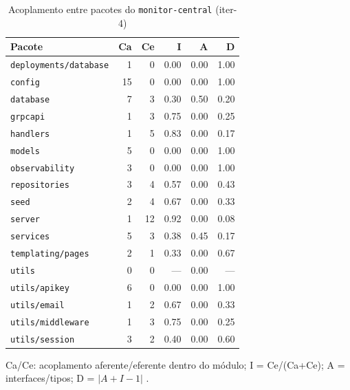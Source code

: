\begin{table}[htbp]
  \centering\small
  \caption{Acoplamento entre pacotes do \texttt{monitor-central} (iter-4)}
  \label{tab:iter-4-acoplamento-central}
  \begin{tabular}{lrrrrr}
    \toprule
    Pacote & Ca & Ce & I & A & D \\
    \midrule
    \texttt{deployments/database} & 1 & 0 & 0.00 & 0.00 & 1.00 \\
    \texttt{config} & 15 & 0 & 0.00 & 0.00 & 1.00 \\
    \texttt{database} & 7 & 3 & 0.30 & 0.50 & 0.20 \\
    \texttt{grpcapi} & 1 & 3 & 0.75 & 0.00 & 0.25 \\
    \texttt{handlers} & 1 & 5 & 0.83 & 0.00 & 0.17 \\
    \texttt{models} & 5 & 0 & 0.00 & 0.00 & 1.00 \\
    \texttt{observability} & 3 & 0 & 0.00 & 0.00 & 1.00 \\
    \texttt{repositories} & 3 & 4 & 0.57 & 0.00 & 0.43 \\
    \texttt{seed} & 2 & 4 & 0.67 & 0.00 & 0.33 \\
    \texttt{server} & 1 & 12 & 0.92 & 0.00 & 0.08 \\
    \texttt{services} & 5 & 3 & 0.38 & 0.45 & 0.17 \\
    \texttt{templating/pages} & 2 & 1 & 0.33 & 0.00 & 0.67 \\
    \texttt{utils} & 0 & 0 & --- & 0.00 & --- \\
    \texttt{utils/apikey} & 6 & 0 & 0.00 & 0.00 & 1.00 \\
    \texttt{utils/email} & 1 & 2 & 0.67 & 0.00 & 0.33 \\
    \texttt{utils/middleware} & 1 & 3 & 0.75 & 0.00 & 0.25 \\
    \texttt{utils/session} & 3 & 2 & 0.40 & 0.00 & 0.60 \\
    \bottomrule
  \end{tabular}
  \par\smallskip\footnotesize Ca/Ce: acoplamento aferente/eferente dentro do módulo; I = Ce/(Ca+Ce); A = interfaces/tipos; D = $|A+I-1|$ \cite{martin2002}.
\end{table}

